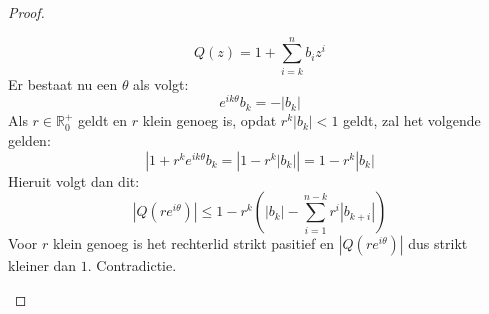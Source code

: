 \documentclass[main.tex]{subfiles}
\begin{document}
\begin{bst}
\begin{proof}
\begin{itemize}
      \[ Q(z) = 1+ \sum_{i=k}^{n}b_{i}z^{i} \]
      Er bestaat nu een $\theta$ als volgt:\needed
      \[ e^{ik\theta}b_{k} = -|b_{k}| \]
      Als $r\in \mathbb{R}_{0}^{+}$ geldt en $r$ klein genoeg is, opdat $r^{k}|b_{k}|<1$ geldt, zal het volgende gelden:
      \[ |1+r^{k}e^{ik\theta}b_{k} = |1-r^{k}|b_{k}|| = 1-r^{k}|b_{k}| \]
      Hieruit volgt dan dit:
      \[ |Q(re^{i\theta})| \le 1-r^{k}\left(|b_{k}| - \sum_{i=1}^{n-k}r^{i}|b_{k+i}|\right) \]
      Voor $r$ klein genoeg is het rechterlid strikt pasitief en $|Q(re^{i\theta})|$ dus strikt kleiner dan $1$.
      Contradictie.
    \end{itemize}
  \end{proof}
\end{bst}
\end{document}
